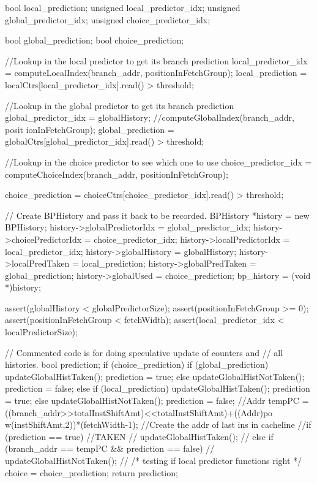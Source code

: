 \begin{DoxyCode}
{
    bool local_prediction;
    unsigned local_predictor_idx;
    unsigned global_predictor_idx;
    unsigned choice_predictor_idx;

    bool global_prediction;
    bool choice_prediction;

    //Lookup in the local predictor to get its branch prediction
    local_predictor_idx = computeLocalIndex(branch_addr, positionInFetchGroup);
    local_prediction = localCtrs[local_predictor_idx].read() > threshold;

    //Lookup in the global predictor to get its branch prediction
    global_predictor_idx = globalHistory; //computeGlobalIndex(branch_addr, posit
      ionInFetchGroup);
    global_prediction = globalCtrs[global_predictor_idx].read() > threshold;

    //Lookup in the choice predictor to see which one to use
    choice_predictor_idx = computeChoiceIndex(branch_addr, positionInFetchGroup);
      
    choice_prediction = choiceCtrs[choice_predictor_idx].read() > threshold;

    // Create BPHistory and pass it back to be recorded.
    BPHistory *history = new BPHistory;
    history->globalPredictorIdx = global_predictor_idx;
    history->choicePredictorIdx = choice_predictor_idx;
    history->localPredictorIdx  = local_predictor_idx;
    history->globalHistory = globalHistory;
    history->localPredTaken = local_prediction;
    history->globalPredTaken = global_prediction;
    history->globalUsed = choice_prediction;
    bp_history = (void *)history;

    assert(globalHistory < globalPredictorSize);
    assert(positionInFetchGroup >= 0);
    assert(positionInFetchGroup < fetchWidth);
    assert(local_predictor_idx < localPredictorSize);

    // Commented code is for doing speculative update of counters and
    // all histories.
        bool prediction;
    if (choice_prediction) {
        if (global_prediction) {
                        updateGlobalHistTaken();
                        prediction = true;
        } else {
                        updateGlobalHistNotTaken();
                        prediction = false;
        }
    } else {
        if (local_prediction) {
                        updateGlobalHistTaken();
                        prediction = true;
        } else {
                        updateGlobalHistNotTaken();
                        prediction = false;
        }
    }
  //Addr tempPC = ((branch_addr>>totalInstShiftAmt)<<totalInstShiftAmt)+((Addr)po
      w(instShiftAmt,2))*(fetchWidth-1); //Create the addr of last ins in cacheline
  //if (prediction == true) { //TAKEN
  //    updateGlobalHistTaken();
  //} else if (branch_addr == tempPC && prediction == false) {
  //    updateGlobalHistNotTaken();
  //}
    /* testing if local predictor functions right */
        choice = choice_prediction;
    return prediction;
}
\end{DoxyCode}
